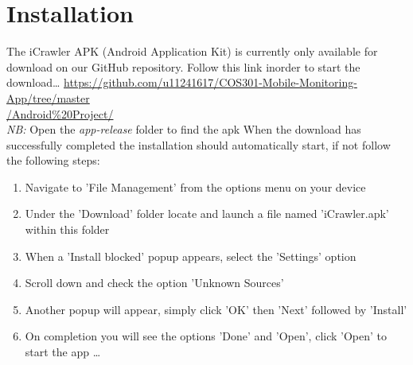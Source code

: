 \documentclass[hidelinks, 12pt, oneside]{article}
\begin{document}
	\section{Installation}
	The iCrawler APK (Android Application Kit) is currently only available for download on our GitHub repository. Follow this link inorder 
	to start the download\dots\newline
		\href{url}{https://github.com/u11241617/COS301-Mobile-Monitoring-App/tree/master\\/Android\%20Project/}\\
		\emph{NB:} Open the \emph{app-release} folder to find the apk \newline \newline
		When the download has successfully completed the installation should automatically start, if not follow the following steps:\newline
	  
	 \begin{enumerate}
 	 	\item Navigate to 'File Management' from the options menu on your device
 	 	\item Under the 'Download' folder locate and launch a file named 'iCrawler.apk' within this folder
 	 	\item When a 'Install blocked' popup appears, select the 'Settings' option
 	 	\item Scroll down and check the option 'Unknown Sources'
 	 	\item Another popup will appear, simply click 'OK' then 'Next' followed by 'Install'
 	 	\item On completion you will see the options 'Done' and 'Open', click 'Open' to start the app \ldots
 	\end{enumerate}\newpage
\end{document}
